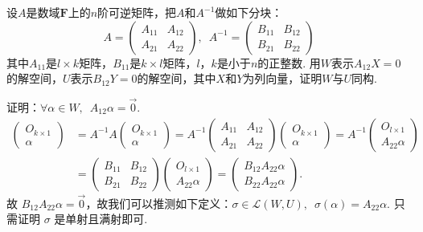 \begin{exercise}
\begin{exgroup}
        \item 设$A$是数域$\mathbf{F}$上的$n$阶可逆矩阵，把$A$和$A^{-1}$做如下分块：
        \[A=\begin{pmatrix}
                A_{11} & A_{12} \\ A_{21} & A_{22}
            \end{pmatrix},\enspace A^{-1}=\begin{pmatrix}
                B_{11} & B_{12} \\ B_{21} & B_{22}
            \end{pmatrix}\]
        其中$A_{11}$是$l \times k$矩阵，$B_{11}$是$k \times l$矩阵，$l$，$k$是小于$n$的正整数. 用$W$表示$A_{12}X=0$的解空间，$U$表示$B_{12}Y=0$的解空间，其中$X$和$Y$为列向量，证明$W$与$U$同构.
        \begin{answer}
            证明：$ \forall \alpha \in W,\enspace A_{12} \alpha = \vec{0} $.
            \begin{align*}
                \begin{pmatrix} O_{k \times 1} \\ \alpha \end{pmatrix}
                & = A^{-1}A \begin{pmatrix} O_{k \times 1} \\ \alpha \end{pmatrix} = A^{-1} \begin{pmatrix} A_{11} & A_{12} \\ A_{21} & A_{22} \end{pmatrix} \begin{pmatrix} O_{k \times 1} \\ \alpha \end{pmatrix} = A^{-1} \begin{pmatrix} O_{l \times 1} \\ A_{22} \alpha \end{pmatrix} \\
                & = \begin{pmatrix} B_{11} & B_{12} \\ B_{21} & B_{22} \end{pmatrix} \begin{pmatrix} O_{l \times 1} \\ A_{22} \alpha \end{pmatrix} = \begin{pmatrix} B_{12} A_{22} \alpha \\ B_{22} A_{22} \alpha \end{pmatrix}.
            \end{align*}
            故 $ B_{12} A_{22} \alpha = \vec{0} $，故我们可以推测如下定义：$ \sigma \in \mathcal{L}(W,U),\enspace \sigma(\alpha) = A_{22} \alpha $.
            只需证明 $ \sigma $ 是单射且满射即可.


\end{answer}
\end{exgroup}
\end{exercise}
